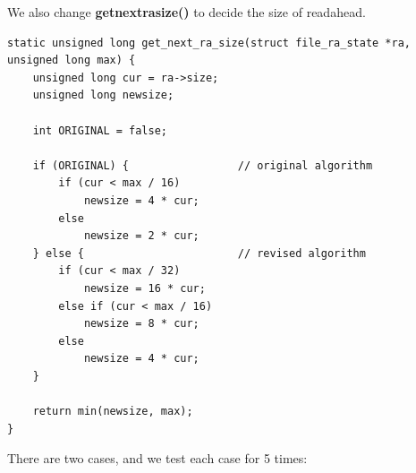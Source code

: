 \documentclass{article}
\renewcommand{\_}{\textscale{.5}{\textunderscore}}
\newcommand{\tb}{\textbf}
\begin{document}
We also change \tb{get\_next\_ra\_size()} to decide the size of readahead.

\begin{lstlisting}
static unsigned long get_next_ra_size(struct file_ra_state *ra, unsigned long max) {
    unsigned long cur = ra->size;
    unsigned long newsize;
    
    int ORIGINAL = false;
    
    if (ORIGINAL) {                 // original algorithm
        if (cur < max / 16)
            newsize = 4 * cur;
        else
            newsize = 2 * cur;
    } else {                        // revised algorithm
        if (cur < max / 32)
            newsize = 16 * cur;
        else if (cur < max / 16)
            newsize = 8 * cur;
        else
            newsize = 4 * cur;
    }

    return min(newsize, max);
}
\end{lstlisting}

There are two cases, and we test each case for 5 times:
\end{document}
